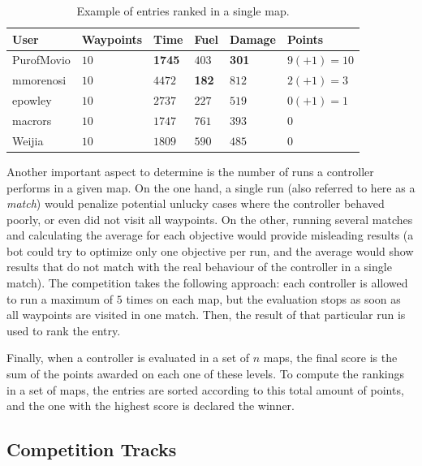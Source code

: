 \documentclass[conference]{IEEEtran}
\begin{document}
\begin{table}[!t]
\begin{center}
\begin{tabular}{|>{\centering\arraybackslash}m{1.25cm}|>{\centering\arraybackslash}m{1.15cm}|>{\centering\arraybackslash}m{0.5cm}|>{\centering\arraybackslash}m{0.5cm}|>{\centering\arraybackslash}m{0.9cm}|>{\centering\arraybackslash}m{1.5cm}|}
\hline
 \textbf{User} & \textbf{Waypoints} & \textbf{Time} & \textbf{Fuel} & \textbf{Damage} & \textbf{Points} \\ 
\hline
PurofMovio & $10$ & \textbf{1745} & $403$ & \textbf{301} & $9 (+1) = 10$\\
\hline
mmorenosi & $10$ & $4472$ & \textbf{182} & $812$ & $2 (+1) = 3$\\
\hline
epowley & $10$ & $2737$ & $227$ & $519$ & $0 (+1) = 1$\\
\hline
\hline
macrors & $10$ & $1747$ & $761$ & $393$ & $0$\\
\hline
Weijia & $10$ & $1809$ & $590$ & $485$ & $0$\\
\hline
\end{tabular}
\caption{Example of entries ranked in a single map. }
\label{tab:rankingSample}
\end{center}
\end{table}

Another important aspect to determine is the number of runs a controller performs in a given map. On the one hand, a single run (also referred to here as a \textit{match}) would penalize potential unlucky cases where the controller behaved poorly, or even did not visit all waypoints. On the other, running several matches and calculating the average for each objective would provide misleading results (a bot could try to optimize only one objective per run, and the average would show results that do not match with the real behaviour of the controller in a single match). The competition takes the following approach: each controller is allowed to run a maximum of $5$ times on each map, but the evaluation stops as soon as all waypoints are visited in one match. Then, the result of that particular run is used to rank the entry.

Finally, when a controller is evaluated in a set of $n$ maps, the final score is the sum of the points awarded on each one of these levels. To compute the rankings in a set of maps, the entries are sorted according to this total amount of points, and the one with the highest score is declared the winner.
	
	
\subsection{Competition Tracks}
\end{document}

